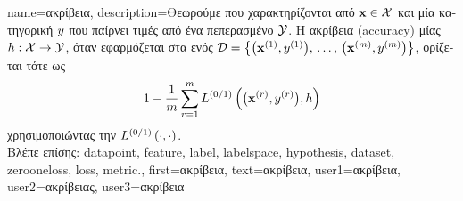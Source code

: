{name={\foreignlanguage{greek}{ακρίβεια}},
	description={\foreignlanguage{greek}{Θεωρούμε} 
		 \foreignlanguage{greek}{που χαρακτηρίζονται από}  ${\bf x} \in \mathcal{X}$ 
		\foreignlanguage{greek}{και μία κατηγορική} 
		$y$ \foreignlanguage{greek}{που παίρνει τιμές από ένα πεπερασμένο}  $\mathcal{Y}$. 
		\foreignlanguage{greek}{Η ακρίβεια} (accuracy) \foreignlanguage{greek}{μίας}  
		$h: \mathcal{X} \rightarrow \mathcal{Y}$, \foreignlanguage{greek}{όταν εφαρμόζεται στα}  
		 \foreignlanguage{greek}{ενός}  
		$\mathcal{D} = \big\{ \big({\bf x}^{(1)}, y^{(1)} \big), \,\ldots, \,\big({\bf x}^{(m)},y^{(m)}\big) \big\}$, 
		\foreignlanguage{greek}{ορίζεται τότε ως} 
		$$1 - \frac{1}{m} \sum_{r=1}^{m} L^{(0/1)}\left(\big({\bf x}^{(r)},y^{(r)}\big),h \right)$$ 
		\foreignlanguage{greek}{χρησιμοποιώντας την}  $L^{(0/1)}\left(\cdot,\cdot \right)$.
		\\
		\foreignlanguage{greek}{Βλέπε επίσης:} \gls{datapoint}, \gls{feature}, \gls{label}, \gls{labelspace}, \gls{hypothesis}, \gls{dataset}, 
		\gls{zerooneloss}, \gls{loss}, \gls{metric}.},
	first={\foreignlanguage{greek}{ακρίβεια}},
	text={\foreignlanguage{greek}{ακρίβεια}},
	user1={\foreignlanguage{greek}{ακρίβεια}}, %
	user2={\foreignlanguage{greek}{ακρίβειας}}, %
	user3={\foreignlanguage{greek}{ακρίβεια}} %
}

